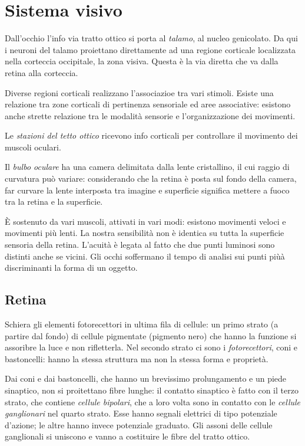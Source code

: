 \documentclass[a4paper,12pt]{article}
\begin{document}
\section{Sistema visivo}
Dall'occhio l'info via tratto ottico si porta al \emph{talamo}, al nucleo genicolato. Da qui i neuroni del talamo proiettano direttamente ad una regione corticale localizzata nella corteccia occipitale, la zona visiva. Questa è la via diretta che va dalla retina alla corteccia.

Diverse regioni corticali realizzano l'associazioe tra vari stimoli. Esiste una relazione tra zone corticali di pertinenza sensoriale ed aree associative: esistono anche strette relazione tra le modalità sensorie e l'organizzazione dei movimenti.

Le \emph{stazioni del tetto ottico} ricevono info corticali per controllare il movimento dei muscoli oculari.

Il \emph{bulbo oculare} ha una camera delimitata dalla lente cristallino, il cui raggio di curvatura può variare: considerando che la retina è posta sul fondo della camera, far curvare la lente interposta tra imagine e superficie significa mettere a fuoco tra la retina e la superficie.

È sostenuto da vari muscoli, attivati in vari modi: esistono movimenti veloci e movimenti più lenti. La nostra sensibilità non è identica su tutta la superficie sensoria della retina. L'acuità è legata al fatto che due punti luminosi sono distinti anche se vicini. Gli occhi soffermano il tempo di analisi sui punti piùà discriminanti la forma di un oggetto.

\subsection{Retina}
Schiera gli elementi fotorecettori in ultima fila di cellule: un primo strato (a partire dal fondo) di cellule pigmentate (pigmento nero) che hanno la funzione si assoribre la luce e non rifletterla. Nel secondo strato ci sono i \emph{fotorecettori}, coni e bastoncelli: hanno la stessa struttura ma non la stessa forma e proprietà. 

Dai coni e dai bastoncelli, che hanno un brevissimo prolungamento e un piede sinaptico, non si proitettano fibre lunghe: il contatto sinaptico è fatto con il terzo strato, che contiene \emph{cellule bipolari}, che a loro volta sono in contatto con le \emph{cellule ganglionari} nel quarto strato. Esse hanno segnali elettrici di tipo potenziale d'azione; le altre hanno invece potenziale graduato. Gli assoni delle cellule ganglionali si uniscono e vanno a costituire le fibre del tratto ottico.
\end{document}
